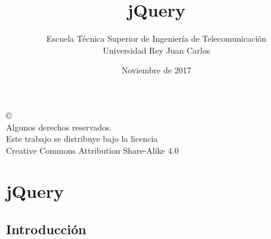 \documentclass[ucs]{beamer}
\begin{document}
\title[jQuery]{jQuery}
\author[GSyC]{Escuela Técnica Superior de Ingeniería de Telecomunicación\\
Universidad Rey Juan Carlos}
\date[2017]{Noviembre de 2017}


\begin{frame}
  \titlepage
\end{frame}




\begin{frame}[b]
\begin{flushright}
{\tiny
\copyright \insertshortdate~\insertshortauthor \\
  Algunos derechos reservados. \\
  Este trabajo se distribuye bajo la licencia \\
  Creative Commons Attribution Share-Alike 4.0
}
\end{flushright}
\end{frame}



%

\section{jQuery}
\subsection{Introducción}
\end{document}
